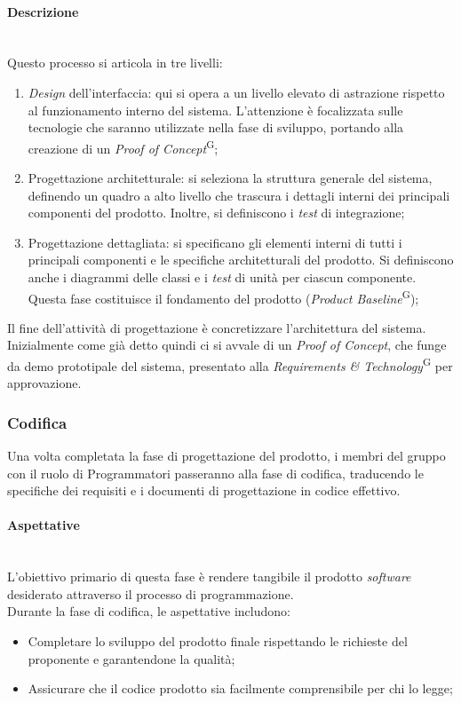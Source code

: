 \documentclass[5pt]{article}
\begin{document}
\paragraph{Descrizione}~\\
Questo processo si articola in tre livelli:
\begin{enumerate}
    \item \textit{Design} dell'interfaccia: qui si opera a un livello elevato di astrazione rispetto al funzionamento interno del sistema. L'attenzione è focalizzata sulle tecnologie che saranno utilizzate nella fase di sviluppo, portando alla creazione di un \textit{Proof of Concept}\textsuperscript{G};
    \item Progettazione architetturale: si seleziona la struttura generale del sistema, definendo un quadro a alto livello che trascura i dettagli interni dei principali componenti del prodotto. Inoltre, si definiscono i \textit{test} di integrazione;
    \item Progettazione dettagliata: si specificano gli elementi interni di tutti i principali componenti e le specifiche architetturali del prodotto. Si definiscono anche i diagrammi delle classi e i \textit{test} di unità per ciascun componente. Questa fase costituisce il fondamento del prodotto (\textit{Product Baseline}\textsuperscript{G});
\end{enumerate}
Il fine dell'attività di progettazione è concretizzare l'architettura del sistema. Inizialmente come già detto quindi ci si avvale di un \textit{Proof of Concept}, che funge da demo prototipale del sistema, presentato alla \textit{Requirements \& Technology}\textsuperscript{G} per approvazione.

\subsubsection{Codifica}
Una volta completata la fase di progettazione del prodotto, i membri del gruppo con il ruolo di Programmatori passeranno alla fase di codifica, traducendo le specifiche dei requisiti e i documenti di progettazione in codice effettivo.

\paragraph{Aspettative}~\\
 L'obiettivo primario di questa fase è rendere tangibile il prodotto \textit{software} desiderato attraverso il processo di programmazione.\\
Durante la fase di codifica, le aspettative includono:
\begin{itemize}
    \item Completare lo sviluppo del prodotto finale rispettando le richieste del proponente e garantendone la qualità;
    \item Assicurare che il codice prodotto sia facilmente comprensibile per chi lo legge;
\end{itemize}
\end{document}
